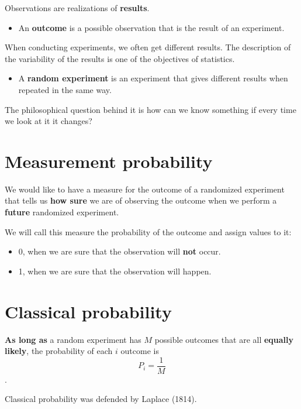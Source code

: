 \documentclass[
]{book}
\providecommand{\tightlist}{%
  \setlength{\itemsep}{0pt}\setlength{\parskip}{0pt}}
\begin{document}
Observations are realizations of \textbf{results}.

\begin{itemize}
\tightlist
\item
  An \textbf{outcome} is a possible observation that is the result of an experiment.
\end{itemize}

When conducting experiments, we often get different results. The description of the variability of the results is one of the objectives of statistics.

\begin{itemize}
\tightlist
\item
  A \textbf{random experiment} is an experiment that gives different results when repeated in the same way.
\end{itemize}

The philosophical question behind it is how can we know something if every time we look at it it changes?

\hypertarget{measurement-probability}{%
\section{Measurement probability}\label{measurement-probability}}

We would like to have a measure for the outcome of a randomized experiment that tells us \textbf{how sure} we are of observing the outcome when we perform a \textbf{future} randomized experiment.

We will call this measure the probability of the outcome and assign values to it:

\begin{itemize}
\item
  0, when we are sure that the observation will \textbf{not} occur.
\item
  1, when we are sure that the observation will happen.
\end{itemize}

\hypertarget{classical-probability}{%
\section{Classical probability}\label{classical-probability}}

\textbf{As long as} a random experiment has \(M\) possible outcomes that are all \textbf{equally likely}, the probability of each \(i\) outcome is \[P_i =\frac{1}{ M}\].

Classical probability was defended by Laplace (1814).
\end{document}
